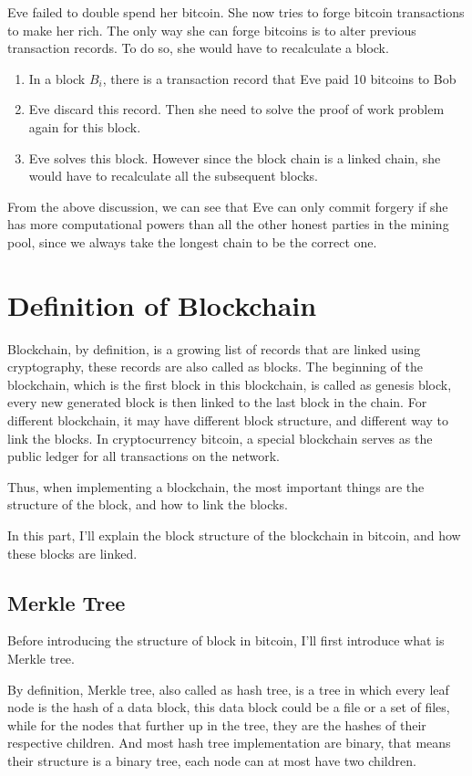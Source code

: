 \documentclass[12pt,a4paper]{article}
\begin{document}
Eve failed to double spend her bitcoin. She now tries to forge bitcoin transactions to make her rich. The only way she can forge bitcoins is to alter previous transaction records. To do so, she would have to recalculate a block.
\begin{enumerate}
	\item In a block $B_i$, there is a transaction record that Eve paid 10 bitcoins to Bob
	\item Eve discard this record. Then she need to solve the proof of work problem again for this block.
	\item Eve solves this block. However since the block chain is a linked chain, she would have to recalculate all the subsequent blocks. 
\end{enumerate}
From the above discussion, we can see that Eve can only commit forgery if she has more computational powers than all the other honest parties in the mining pool, since we always take the longest chain to be the correct one.

\section{Definition of Blockchain}\label{def}
Blockchain, by definition, is a growing list of records that are linked using cryptography, these records are also called as blocks. The beginning of the blockchain, which is the first block in this blockchain, is called as genesis block, every new generated block is then linked to the last block in the chain. For different blockchain, it may have different block structure, and different way to link the blocks. In cryptocurrency bitcoin, a special blockchain serves as the public ledger for all transactions on the network. 

Thus, when implementing a blockchain, the most important things are the structure of the block, and how to link the blocks.

In this part, I'll explain the block structure of the blockchain in bitcoin, and how these blocks are linked.

\subsection{Merkle Tree}

Before introducing the structure of block in bitcoin, I'll first introduce what is Merkle tree.

By definition, Merkle tree, also called as hash tree, is a tree in which every leaf node is the hash of a data block, this data block could be a file or a set of files, while for the nodes that further up in the tree, they are the hashes of their respective children. And most hash tree implementation are binary, that means their structure is a binary tree, each node can at most have two children.
\end{document}
